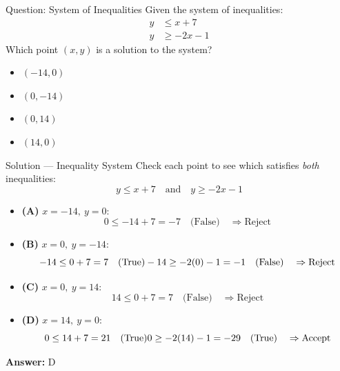 \documentclass{beamer}
\begin{document}
\begin{frame}{Question: System of Inequalities}
    \small
    Given the system of inequalities:
    \[
    \begin{aligned}
        y &\leq x + 7 \\
        y &\geq -2x - 1
    \end{aligned}
    \]
    Which point $(x, y)$ is a solution to the system?

    \begin{itemize}
        \item[(A)] $(-14, 0)$
        \item[(B)] $(0, -14)$
        \item[(C)] $(0, 14)$
        \item[(D)] $(14, 0)$
    \end{itemize}
\end{frame}
\begin{frame}{Solution — Inequality System}
    \small
    Check each point to see which satisfies \emph{both} inequalities:
    \[
    y \leq x + 7 \quad \text{and} \quad y \geq -2x - 1
    \]

    \begin{itemize}
        \item \textbf{(A)} $x = -14,\ y = 0$:
        \[
        0 \leq -14 + 7 = -7 \quad \text{(False)} \quad \Rightarrow \text{Reject}
        \]

        \item \textbf{(B)} $x = 0,\ y = -14$:
        \[
        -14 \leq 0 + 7 = 7 \quad \text{(True)} \\
        -14 \geq -2(0) - 1 = -1 \quad \text{(False)} \quad \Rightarrow \text{Reject}
        \]

        \item \textbf{(C)} $x = 0,\ y = 14$:
        \[
        14 \leq 0 + 7 = 7 \quad \text{(False)} \quad \Rightarrow \text{Reject}
        \]

        \item \textbf{(D)} $x = 14,\ y = 0$:
        \[
        0 \leq 14 + 7 = 21 \quad \text{(True)} \\
        0 \geq -2(14) - 1 = -29 \quad \text{(True)} \quad \Rightarrow \text{Accept}
        \]
    \end{itemize}

    \textbf{Answer:} $\boxed{\text{D}}$
\end{frame}
\end{document}

